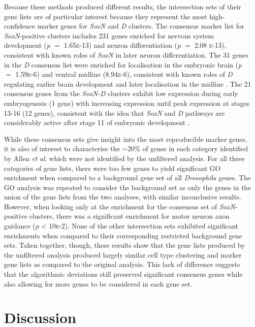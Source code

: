 \documentclass[withindex,glossary]{cam-thesis}
\begin{document}
Because these methods produced different results, the intersection sets of their gene lists are of particular interest because they represent the most high-confidence marker genes for \emph{SoxN} and \emph{D} clusters. The consensus marker list for \emph{SoxN}-positive clusters includes 231 genes enriched for nervous system development (\emph{p} $=$ 1.65\textsc{e}-13) and neuron differentiation (\emph{p} $=$ 2.08 \textsc{e}-13), consistent with known roles of \emph{SoxN} in later neuron differentiation. The 31 genes in the \emph{D} consensus list were enriched for localisation in the embryonic brain (\emph{p} $=$ 1.59\textsc{e}-6) and ventral midline (8.94\textsc{e}-6), consistent with known roles of \emph{D} regulating earlier brain development and later localisation in the midline . The 21 consensus genes from the \emph{SoxN-D} clusters exhibit low expression during early embryogenesis (1 gene) with increasing expression until peak expression at stages 13-16 (12 genes), consistent with the idea that \emph{SoxN} and \emph{D} pathways are considerably active after stage 11 of embryonic development .

While these consensus sets give insight into the most reproducible marker genes, it is also of interest to characterise the $\sim{}20$\% of genes in each category identified by Allen \emph{et al}. which were not identified by the unfiltered analysis. For all three categories of gene lists, there were too few genes to yield significant GO enrichment when compared to a background gene set of all \emph{Drosophila} genes. The GO analysis was repeated to consider the background set as only the genes in the union of the gene lists from the two analyses, with similar inconclusive results. However, when looking only at the enrichment for the consensus set of \emph{SoxN}-positive clusters, there was a significant enrichment for motor neuron axon guidance (\emph{p} \textless{} 10\textsc{e}-2). None of the other intersection sets exhibited significant enrichments when compared to their corresponding restricted background gene sets. Taken together, though, these results show that the gene lists produced by the unfiltered analysis produced largely similar cell type clustering and marker gene lists as compared to the original analysis. This lack of difference suggests that the algorithmic deviations still preserved significant consensus genes while also allowing for more genes to be considered in each gene set.

\section{Discussion}
\end{document}
